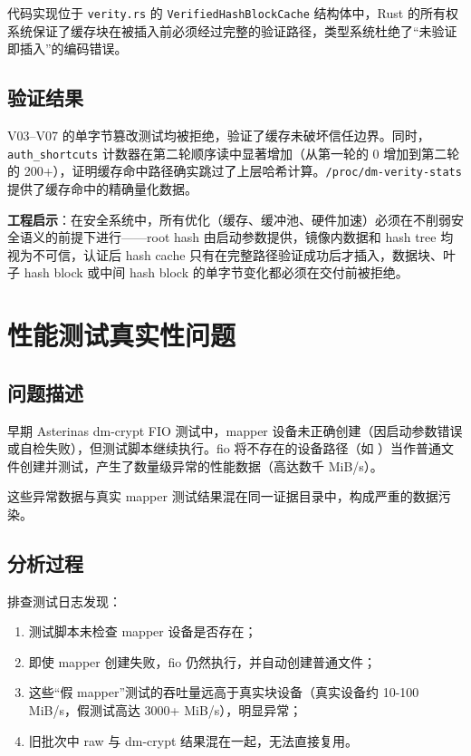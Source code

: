 代码实现位于 \texttt{verity.rs} 的 \texttt{VerifiedHashBlockCache} 结构体中，Rust 的所有权系统保证了缓存块在被插入前必须经过完整的验证路径，类型系统杜绝了“未验证即插入”的编码错误。

\subsection{验证结果}

V03--V07 的单字节篡改测试均被拒绝，验证了缓存未破坏信任边界。同时，\texttt{auth\_shortcuts} 计数器在第二轮顺序读中显著增加（从第一轮的 0 增加到第二轮的 200+），证明缓存命中路径确实跳过了上层哈希计算。\texttt{/proc/dm-verity-stats} 提供了缓存命中的精确量化数据。

\textbf{工程启示}：在安全系统中，所有优化（缓存、缓冲池、硬件加速）必须在不削弱安全语义的前提下进行——root hash 由启动参数提供，镜像内数据和 hash tree 均视为不可信，认证后 hash cache 只有在完整路径验证成功后才插入，数据块、叶子 hash block 或中间 hash block 的单字节变化都必须在交付前被拒绝。

\section{性能测试真实性问题}

\subsection{问题描述}

早期 Asterinas dm-crypt FIO 测试中，mapper 设备未正确创建（因启动参数错误或自检失败），但测试脚本继续执行。fio 将不存在的设备路径（如 \texttt{}）当作普通文件创建并测试，产生了数量级异常的性能数据（高达数千 MiB/s）。

这些异常数据与真实 mapper 测试结果混在同一证据目录中，构成严重的数据污染。

\subsection{分析过程}

排查测试日志发现：
\begin{enumerate}
    \item 测试脚本未检查 mapper 设备是否存在；
    \item 即使 mapper 创建失败，fio 仍然执行，并自动创建普通文件；
    \item 这些“假 mapper”测试的吞吐量远高于真实块设备（真实设备约 10-100 MiB/s，假测试高达 3000+ MiB/s），明显异常；
    \item 旧批次中 raw 与 dm-crypt 结果混在一起，无法直接复用。
\end{enumerate}

